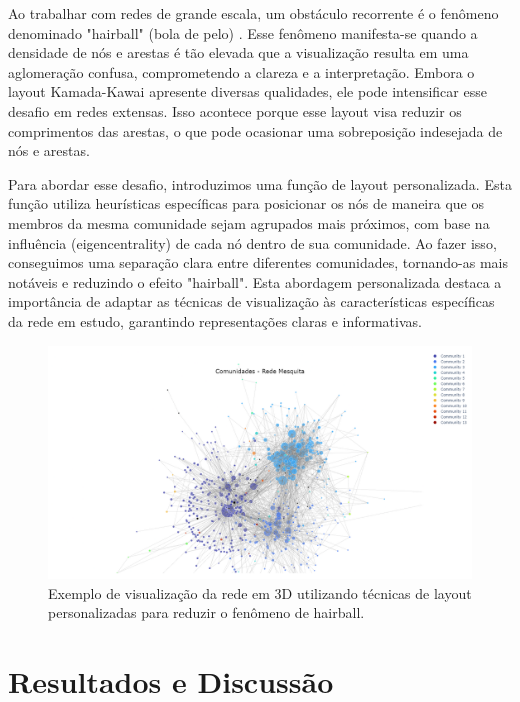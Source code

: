 Ao trabalhar com redes de grande escala, um obstáculo recorrente é o fenômeno denominado "hairball" (bola de pelo) \cite{2016_Tang}. Esse fenômeno manifesta-se quando a densidade de nós e arestas é tão elevada que a visualização resulta em uma aglomeração confusa, comprometendo a clareza e a interpretação. Embora o layout Kamada-Kawai apresente diversas qualidades, ele pode intensificar esse desafio em redes extensas. Isso acontece porque esse layout visa reduzir os comprimentos das arestas, o que pode ocasionar uma sobreposição indesejada de nós e arestas.

Para abordar esse desafio, introduzimos uma função de layout personalizada. Esta função utiliza heurísticas específicas para posicionar os nós de maneira que os membros da mesma comunidade sejam agrupados mais próximos, com base na influência (eigencentrality) de cada nó dentro de sua comunidade. Ao fazer isso, conseguimos uma separação clara entre diferentes comunidades, tornando-as mais notáveis e reduzindo o efeito "hairball". Esta abordagem personalizada destaca a importância de adaptar as técnicas de visualização às características específicas da rede em estudo, garantindo representações claras e informativas.

\begin{figure}[h]
	\centering
	\includegraphics[scale=0.3]{images/3d_plot_hairball_buster.png}
	\caption{Exemplo de visualização da rede em 3D utilizando técnicas de layout personalizadas para reduzir o fenômeno de hairball.}
	\label{fig:3d_plot_hairball_buster}
	\fautor
\end{figure}

\section{Resultados e Discussão}

